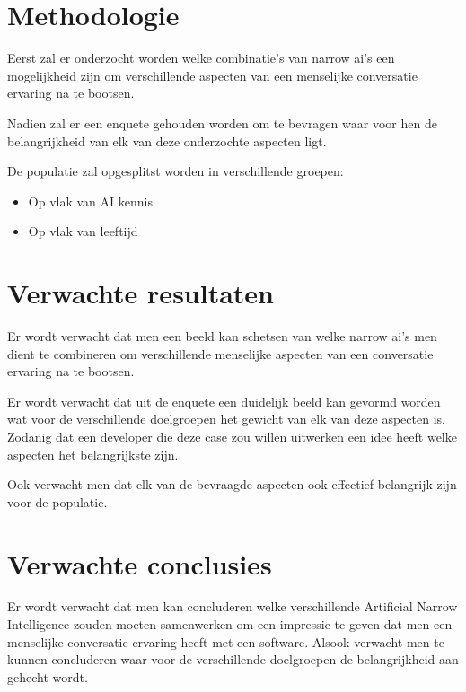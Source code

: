 \section{Methodologie}
\label{sec:methodologie}
Eerst zal er onderzocht worden welke combinatie's van narrow ai's een mogelijkheid zijn om verschillende aspecten van een menselijke conversatie ervaring na te bootsen.

Nadien zal er een  enquete gehouden worden om te bevragen waar voor hen de belangrijkheid van elk van deze onderzochte aspecten ligt.

De populatie zal opgesplitst worden in verschillende groepen:

\begin{itemize}
    \item Op vlak van AI kennis
    \item Op vlak van leeftijd
\end{itemize}

\section{Verwachte resultaten}
\label{sec:verwachte_resultaten}

Er wordt verwacht dat men een beeld kan schetsen van welke narrow ai's men dient te combineren om verschillende menselijke aspecten van een conversatie ervaring na te bootsen.

Er wordt verwacht dat uit de enquete een duidelijk beeld kan gevormd worden wat voor de verschillende doelgroepen het gewicht van elk van deze aspecten is. Zodanig dat een developer die deze case zou willen uitwerken een idee heeft welke aspecten het belangrijkste zijn.

Ook verwacht men dat elk van de bevraagde aspecten ook effectief belangrijk zijn voor de populatie.

\section{Verwachte conclusies}
\label{sec:verwachte_conclusies}

Er wordt verwacht dat men kan concluderen welke verschillende Artificial Narrow Intelligence zouden moeten samenwerken om een impressie te geven dat men een menselijke conversatie ervaring heeft met een software. Alsook verwacht men te kunnen concluderen waar voor de verschillende doelgroepen de belangrijkheid aan gehecht wordt.


